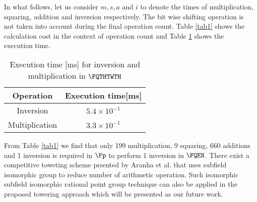 In what follows, let us consider $m,s,a$ and $i$ to denote the times of multiplication, squaring, addition and inversion respectively. The bit wise shifting operation is not taken into account during the final operation count.
Table \ref{tab1} shows the calculation cost in the context of  operation count and Table \ref{tab3} shows the execution time.
\renewcommand{\baselinestretch}{1.5}
\begin{table}[!ht]
\renewcommand{\arraystretch}{1.3}
\centering
\caption{$\FQTHTWTH$ operation count}
\label{tab1}
\end{table}


\begin{table}[!ht]
\renewcommand{\arraystretch}{1.3}
\centering
\caption{Execution time [ms] for inversion and multiplication in $\FQTHTWTH$}
\label{tab3}
\begin{tabular}{c|c}
\hline 
Operation & Execution time[ms] \\ 
\hline\hline 
Inversion &  $5.4 \times  10^{-1}$ \\
\hline
Multiplication & $3.3 \times  10^{-1}$ \\
\hline  
\end{tabular}
\end{table}
\renewcommand{\baselinestretch}{1.0}
From Table \ref{tab1} we find that only 199 multiplication, 9 squaring, 660 additions and 1 inversion is required in $\Fp$ to perform 1 inversion in $\FQEN$.
There exist a competitive toweting scheme prsented by Aranha et al. \cite{PAIRING:AFKMR12} that uses subfield isomorphic group to reduce number of arithmetic operation. Such isomorphic subfield isomorphic rational point group technique can also be applied in the proposed towering approach which will be presented as our future work.

